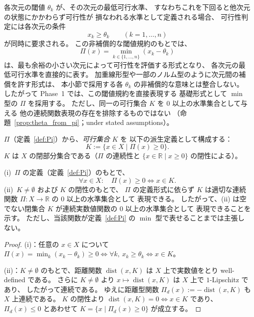 \begin{remark}
\label{rem:min_type_pi}
各次元の閾値 $\theta_k$ が、その次元の最低可行水準、
すなわちこれを下回ると他次元の状態にかかわらず可行性が
損なわれる水準として定義される場合、
可行性判定には各次元の条件
\[
  x_k\geq\theta_k
  \qquad (k=1,\ldots,n)
\]
が同時に要求される。
この非補償的な閾値規約のもとでは、
\[
  \Pi(x) = \min_{k\in\{1,\ldots,n\}} (x_k-\theta_k)
\]
は、最も余裕の小さい次元によって可行性を評価する形式となり、
各次元の最低可行水準を直接的に表す。
加重線形型や一部のノルム型のように次元間の補償を許す形式は、
本小節で採用する各 $\theta_k$ の非補償的な意味とは整合しない。
したがって Phase~1 では、この閾値規約を直接表現する
基礎形式として $\min$ 型の $\Pi$ を採用する。
ただし、同一の可行集合 $K$ を $0$ 以上の水準集合として与える
他の連続関数表現の存在を排除するものではない
（命題~\ref{prop:theta_from_pi}；under stated assumptions）。
\end{remark}

\begin{definition}[可行集合]
\label{def:K}
$\Pi$（定義~\ref{def:Pi}）から、\emph{可行集合} $K$ を
以下の派生定義として構成する：
\[
  K := \{x\in X \mid \Pi(x)\geq 0\}.
\]
$K$ は $X$ の閉部分集合である（$\Pi$ の連続性と
$\{x\in\mathbb{R}\mid x\geq 0\}$ の閉性による）。
\end{definition}

\begin{proposition}
\label{prop:theta_from_pi}
(i)\ $\Pi$ の定義（定義~\ref{def:Pi}）のもとで、
\[
  \forall x\in X:
  \quad
  \Pi(x)\geq 0 \iff x\in K .
\]
(ii)\ $K\neq\emptyset$ および $K$ の閉性のもとで、
$\Pi$ の定義形式に依らず $K$ は適切な連続関数
$\Pi : X \to\mathbb{R}$ の $0$ 以上の水準集合として
表現できる。
したがって、(ii) は空でない閉集合 $K$ が連続実数値関数の $0$ 以上の水準集合として
表現できることを示す。
ただし、当該関数が定義~\ref{def:Pi} の $\min$ 型で表せることまでは主張しない。
\end{proposition}

\begin{proof}
(i)：任意の $x\in X$ について
$\Pi(x) = \min_k(x_k - \theta_k)\geq 0
\iff \forall k,\ x_k\geq\theta_k
\iff x\in K$。

\smallskip
(ii)：$K\neq\emptyset$ のもとで、距離関数
$\operatorname{dist}(x, K)$ は $X$ 上で実数値をとり
well-defined である。
さらに $K\neq\emptyset$ より
$x\mapsto\operatorname{dist}(x, K)$ は $X$ 上で $1$-Lipschitz であり、
したがって連続である。
ゆえに距離型関数
$\Pi_d(x) := -\operatorname{dist}(x, K)$ も $X$ 上連続である。
$K$ の閉性より $\operatorname{dist}(x, K)=0 \iff x\in K$ であり、
$\Pi_d(x)\leq 0$ とあわせて
$K = \{x \mid \Pi_d(x)\geq 0\}$ が成立する。
\end{proof}

